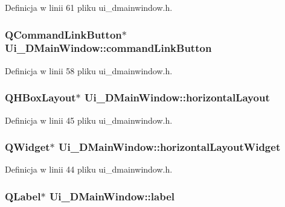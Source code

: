 Definicja w linii 61 pliku ui\-\_\-dmainwindow.\-h.

\hypertarget{class_ui___d_main_window_a0d790fbf37bac850b60a7cb42d100315}{
\subsubsection[{command\-Link\-Button}]{\setlength{\rightskip}{0pt plus 5cm}Q\-Command\-Link\-Button$\ast$ Ui\-\_\-\-D\-Main\-Window\-::command\-Link\-Button}}\label{class_ui___d_main_window_a0d790fbf37bac850b60a7cb42d100315}


Definicja w linii 58 pliku ui\-\_\-dmainwindow.\-h.

\hypertarget{class_ui___d_main_window_a4ab6ff85d8c5edef531b3f2111a04157}{
\subsubsection[{horizontal\-Layout}]{\setlength{\rightskip}{0pt plus 5cm}Q\-H\-Box\-Layout$\ast$ Ui\-\_\-\-D\-Main\-Window\-::horizontal\-Layout}}\label{class_ui___d_main_window_a4ab6ff85d8c5edef531b3f2111a04157}


Definicja w linii 45 pliku ui\-\_\-dmainwindow.\-h.

\hypertarget{class_ui___d_main_window_a777a56f3b74aa5b5cd5ff2c62a2968a9}{
\subsubsection[{horizontal\-Layout\-Widget}]{\setlength{\rightskip}{0pt plus 5cm}Q\-Widget$\ast$ Ui\-\_\-\-D\-Main\-Window\-::horizontal\-Layout\-Widget}}\label{class_ui___d_main_window_a777a56f3b74aa5b5cd5ff2c62a2968a9}


Definicja w linii 44 pliku ui\-\_\-dmainwindow.\-h.

\hypertarget{class_ui___d_main_window_aa528e417bc72cda19dfcea49f1617b2a}{
\subsubsection[{label}]{\setlength{\rightskip}{0pt plus 5cm}Q\-Label$\ast$ Ui\-\_\-\-D\-Main\-Window\-::label}}\label{class_ui___d_main_window_aa528e417bc72cda19dfcea49f1617b2a}


